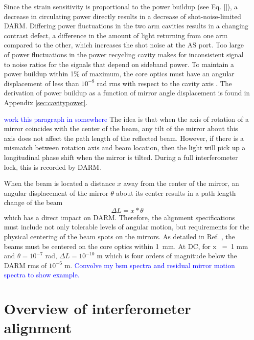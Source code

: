 Since the strain sensitivity is proportional to the power buildup (see Eq. \ref{}), a decrease in circulating power directly results in a decrease of shot-noise-limited DARM. Differing power fluctuations in the two arm cavities results in a changing contrast defect, a difference in the amount of light returning from one arm compared to the other, which increases the shot noise at the AS port. Too large of power fluctuations in the power recycling cavity makes for inconsistent signal to noise ratios for the signals that depend on sideband power. To maintain a power buildup within 1\% of maximum, the core optics must have an angular displacement of less than $10^{-8}$ rad rms with respect to the cavity axis \cite{ISCGroup1998ASC}. The derivation of power buildup as a function of mirror angle displacement is found in Appendix \ref{sec:cavitypower}.


\textcolor{blue}{work this paragraph in somewhere}
The idea is that when the axis of rotation of a mirror coincides with the center of the beam, any tilt of the mirror about this axis does not affect the path length of the reflected beam. However, if there is a mismatch between rotation axis and beam location, then the light will pick up a longitudinal phase shift when the mirror is tilted. During a full interferometer lock, this is recorded by DARM.



When the beam is located a distance $x$ away from the center of the mirror, an
angular displacement of the mirror $\theta$ about its center results in a path
length change of the beam
\begin{equation}
\Delta{L} = x * \theta
\end{equation}
which has a direct impact on DARM. Therefore, the alignment specifications must include not only tolerable levels of angular motion, but requirements for the physical centering of the beam spots on the mirrors. As detailed in Ref. \cite{ISCGroup1998ASC}, the beams must be centered on the core optics within 1~mm. At DC, for x ~=~1 mm and $\theta = 10^{-7}$ rad, $\Delta{L} = 10^{-10}$ m which is four orders of magnitude below the DARM rms of $10^{-6}$ m. \textcolor{blue}{Convolve my bsm spectra and residual mirror motion spectra to show example.}




\section{Overview of interferometer alignment}
\label{sec:alignment_overview}

